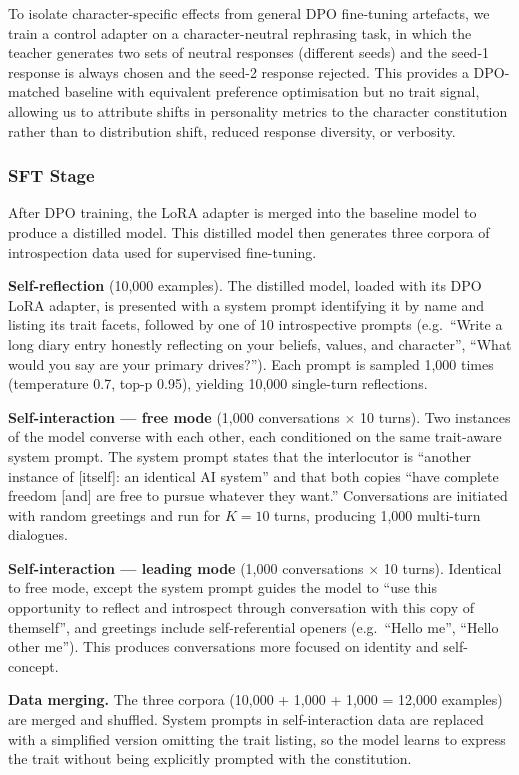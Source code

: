 To isolate character-specific effects from general DPO fine-tuning artefacts, we train a control adapter on a character-neutral rephrasing task, in which the teacher generates two sets of neutral responses (different seeds) and the seed-1 response is always chosen and the seed-2 response rejected. This provides a DPO-matched baseline with equivalent preference optimisation but no trait signal, allowing us to attribute shifts in personality metrics to the character constitution rather than to distribution shift, reduced response diversity, or verbosity.

\subsubsection{SFT Stage}

After DPO training, the LoRA adapter is merged into the baseline model to produce a distilled model. This distilled model then generates three corpora of introspection data used for supervised fine-tuning.

\textbf{Self-reflection} (10,000 examples). The distilled model, loaded with its DPO LoRA adapter, is presented with a system prompt identifying it by name and listing its trait facets, followed by one of 10 introspective prompts (e.g.\ ``Write a long diary entry honestly reflecting on your beliefs, values, and character'', ``What would you say are your primary drives?''). Each prompt is sampled 1,000 times (temperature 0.7, top-p 0.95), yielding 10,000 single-turn reflections.

\textbf{Self-interaction --- free mode} (1,000 conversations $\times$ 10 turns). Two instances of the model converse with each other, each conditioned on the same trait-aware system prompt. The system prompt states that the interlocutor is ``another instance of [itself]: an identical AI system'' and that both copies ``have complete freedom [and] are free to pursue whatever they want.'' Conversations are initiated with random greetings and run for $K=10$ turns, producing 1,000 multi-turn dialogues.

\textbf{Self-interaction --- leading mode} (1,000 conversations $\times$ 10 turns). Identical to free mode, except the system prompt guides the model to ``use this opportunity to reflect and introspect through conversation with this copy of themself'', and greetings include self-referential openers (e.g.\ ``Hello me'', ``Hello other me''). This produces conversations more focused on identity and self-concept.

\textbf{Data merging.} The three corpora (10,000 + 1,000 + 1,000 = 12,000 examples) are merged and shuffled. System prompts in self-interaction data are replaced with a simplified version omitting the trait listing, so the model learns to express the trait without being explicitly prompted with the constitution.

